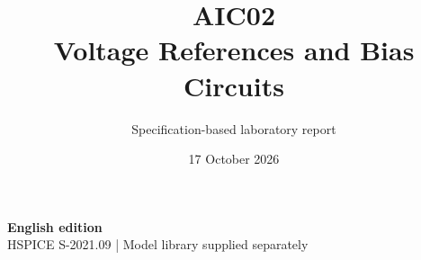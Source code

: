 \documentclass[11pt,a4paper]{article}
\title{\color{accent}AIC02\\[4pt]Voltage References and Bias Circuits}
\author{Specification-based laboratory report}
\date{17 October 2026}
\begin{document}
\maketitle
\begin{center}\small\textbf{English edition}\\
HSPICE S-2021.09 \quad | \quad Model library supplied separately
\end{center}


\end{document}
